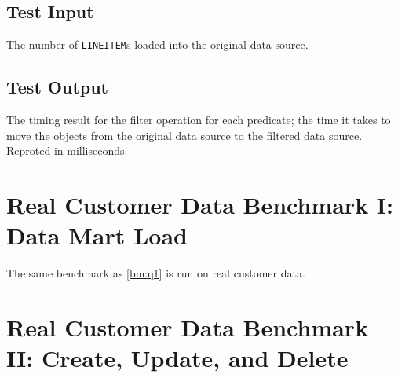 \subsection{Test Input}
\label{sub:Test Input}
The number of \texttt{LINEITEM}s loaded into the original data source.

\subsection{Test Output}
\label{sub:Test Output}
The timing result for the filter operation for each predicate; the time it takes to move the objects from the original data source to the filtered data source. Reproted in milliseconds.

\section{Real Customer Data Benchmark I: Data Mart Load}
\label{bm:odin-load}
The same benchmark as \ref{bm:q1} is run on real customer data.

\section{Real Customer Data Benchmark II: Create, Update, and Delete}
\label{bm:odin-crud}



